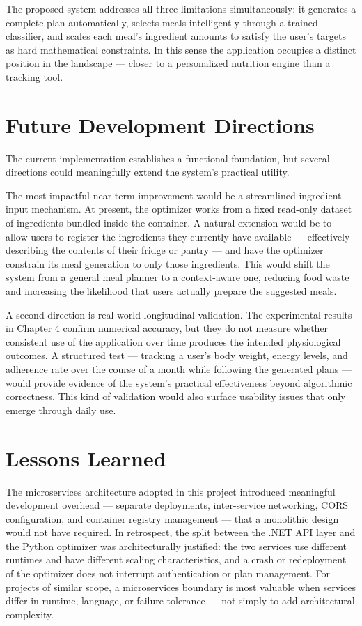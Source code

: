 The proposed system addresses all three limitations simultaneously: it generates a
complete plan automatically, selects meals intelligently through a trained classifier,
and scales each meal's ingredient amounts to satisfy the user's targets as hard
mathematical constraints. In this sense the application occupies a distinct position
in the landscape — closer to a personalized nutrition engine than a tracking tool.

\section{Future Development Directions}

The current implementation establishes a functional foundation, but several directions
could meaningfully extend the system's practical utility.

The most impactful near-term improvement would be a streamlined ingredient input
mechanism. At present, the optimizer works from a fixed read-only dataset of
ingredients bundled inside the container. A natural extension would be to allow users
to register the ingredients they currently have available — effectively describing the
contents of their fridge or pantry — and have the optimizer constrain its meal
generation to only those ingredients. This would shift the system from a general
meal planner to a context-aware one, reducing food waste and increasing the
likelihood that users actually prepare the suggested meals.

A second direction is real-world longitudinal validation. The experimental results in
Chapter 4 confirm numerical accuracy, but they do not measure whether consistent use
of the application over time produces the intended physiological outcomes. A structured
test — tracking a user's body weight, energy levels, and adherence rate over the course
of a month while following the generated plans — would provide evidence of the system's
practical effectiveness beyond algorithmic correctness. This kind of validation would
also surface usability issues that only emerge through daily use.

\section{Lessons Learned}

The microservices architecture adopted in this project introduced meaningful development
overhead — separate deployments, inter-service networking, CORS configuration, and
container registry management — that a monolithic design would not have required. In
retrospect, the split between the .NET API layer and the Python optimizer was
architecturally justified: the two services use different runtimes and have different
scaling characteristics, and a crash or redeployment of the optimizer does not
interrupt authentication or plan management. For projects of similar scope, a 
microservices boundary is most valuable when services differ in runtime, language, or 
failure tolerance — not simply to add architectural complexity.

